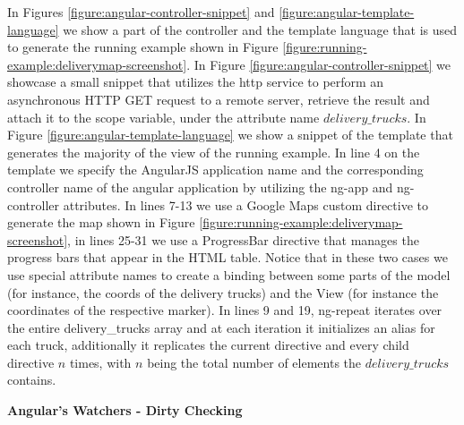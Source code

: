 {
In Figures \ref{figure:angular-controller-snippet} and \ref{figure:angular-template-language} we show a part of the controller and the template language that is used to generate the running example shown in Figure \ref{figure:running-example:deliverymap-screenshot}. In Figure \ref{figure:angular-controller-snippet} we showcase a small snippet that utilizes the http service to perform an asynchronous HTTP GET request to a remote server, retrieve the result and attach it to the scope variable, under the attribute name $delivery\_trucks$. In Figure \ref{figure:angular-template-language} we show a snippet of the template that generates the majority of the view of the running example. In line 4 on the template we specify the AngularJS application name and the corresponding controller name of the angular application by utilizing the ng-app and ng-controller attributes. In lines 7-13 we use a Google Maps custom directive to generate the map shown in Figure \ref{figure:running-example:deliverymap-screenshot}, in lines 25-31 we use a ProgressBar directive that manages the progress bars that appear in the HTML table. Notice that in these two cases we use special attribute names to create a binding between some parts of the model (for instance, the coords of the delivery trucks) and the View (for instance the coordinates of the respective marker). In lines 9 and 19, ng-repeat iterates over the entire delivery\_trucks array and at each iteration it initializes an alias for each truck, additionally it replicates the current directive and every child directive $n$ times, with $n$ being the total number of elements the $delivery\_trucks$ contains. 






\textbf{Angular's Watchers - Dirty Checking}

}
